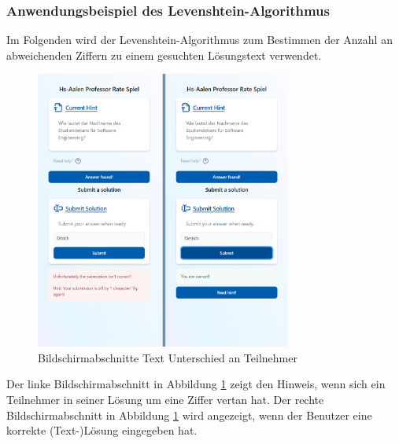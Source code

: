 \subsubsection{Anwendungsbeispiel des Levenshtein-Algorithmus}

Im Folgenden wird der Levenshtein-Algorithmus zum Bestimmen der Anzahl an abweichenden Ziffern zu einem gesuchten Lösungstext verwendet.

\begin{figure}[H]
    \centering
    \includegraphics[width=0.75\textwidth]{images/PrAr_Impl_CharacterDiff-UI.png}
    \caption{Bildschirmabschnitte Text Unterschied an Teilnehmer}
    \label{fig:implementierung:characterdiff_ui}
\end{figure}

Der linke Bildschirmabschnitt in Abbildung \ref{fig:implementierung:characterdiff_ui} zeigt den Hinweis, wenn sich ein Teilnehmer in seiner Lösung um eine Ziffer vertan hat. Der rechte Bildschirmabschnitt in Abbildung \ref{fig:implementierung:characterdiff_ui} wird angezeigt, wenn der Benutzer eine korrekte (Text-)Lösung eingegeben hat.
